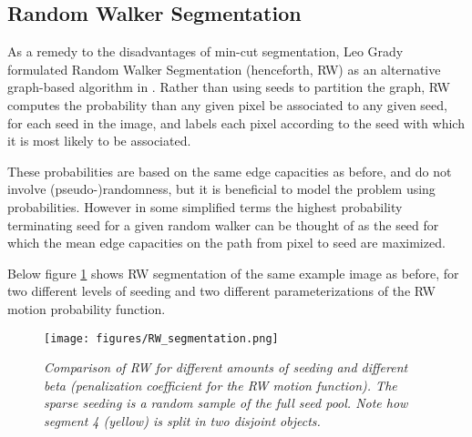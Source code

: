 

\subsection{Random Walker Segmentation}

As a remedy to the disadvantages of min-cut segmentation, Leo Grady formulated
Random Walker Segmentation (henceforth, RW) as an alternative graph-based
algorithm in \cite{grady}. Rather than using seeds to partition the graph, RW
computes the probability than any given pixel be associated to any given seed,
for each seed in the image, and labels each pixel according to the seed with
which it is most likely to be associated.

These probabilities are based on the same edge capacities as before, and do not
involve (pseudo-)randomness, but it is beneficial to model the problem using
probabilities. However in some simplified terms the highest probability
terminating seed for a given random walker can be thought of as the seed
for which the mean edge capacities on the path from pixel to seed are maximized.


\medskip

Below figure \cref{fig:RW-seg} shows RW segmentation of the same example image
as before, for two different levels of seeding and two different
parameterizations of the RW motion probability function.


\begin{figure}%
  \texttt{[image: figures/RW\_segmentation.png]}
  \caption{\small \textit{Comparison of RW for different amounts of
  seeding and different beta (penalization coefficient for the RW motion
  function). The sparse seeding is a random sample
  of the full seed pool. Note how segment 4 (yellow) is split in two disjoint
  objects.}}
  \label{fig:RW-seg}
\end{figure}

